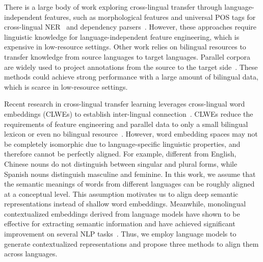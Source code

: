 \documentclass[11pt,a4paper]{article}
\begin{document}
	There is a large body of work exploring cross-lingual transfer through language-independent features, such as morphological features and universal POS tags for cross-lingual NER~\cite{tsai16cross} and dependency parsers~\cite{McDonald11multi}. However, these approaches require linguistic knowledge for language-independent feature engineering, which is expensive in low-resource settings. Other work relies on bilingual resources to transfer knowledge from source languages to target languages. Parallel corpora are widely used to project annotations from the source to the target side~\cite{yarowsky2001inducing,ehrmann11building,kim12multilingual,wang14cross}. These methods could achieve strong performance with a large amount of bilingual data, which is scarce in low-resource settings. 
	
	Recent research in cross-lingual transfer learning leverages cross-lingual word embeddings (CLWEs) to establish inter-lingual connection~\cite{ni17weakly,fang2017model,xie2018neural}. 
	CLWEs reduce the requirements of feature engineering and parallel data to only a small bilingual lexicon or even no bilingual resource~\cite{artetxe16learning,conneau2017word}. However, word embedding spaces may not be completely isomorphic due to language-specific linguistic properties, and therefore cannot be perfectly aligned. For example, different from English, Chinese nouns do not distinguish between singular and plural forms, while Spanish nouns distinguish masculine and feminine. In this work, we assume that the semantic meanings of words from different languages can be roughly aligned at a conceptual level. This assumption motivates us to align deep semantic representations instead of shallow word embeddings. Meanwhile, monolingual contextualized embeddings derived from language models have shown to be effective for extracting semantic information and have achieved significant improvement on several NLP tasks~\cite{peters2018deep}. Thus, we employ language models to generate contextualized representations and propose three methods to align them across languages.
	
\end{document}
